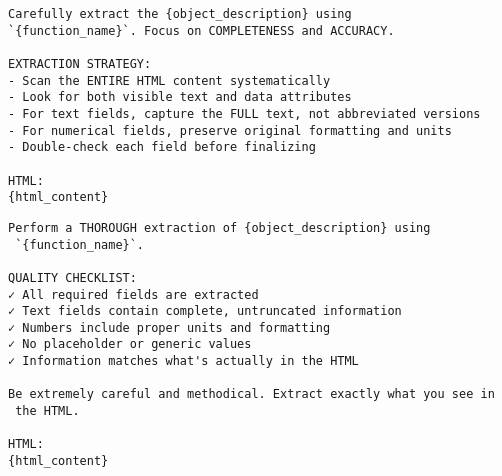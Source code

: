 \begin{latin}
\begin{tcolorbox}[colback=black!5!white,colframe=black!75!black,title=Expert Agent: Round 2 (Accuracy and Completeness)]
\begin{verbatim}
Carefully extract the {object_description} using 
`{function_name}`. Focus on COMPLETENESS and ACCURACY.

EXTRACTION STRATEGY:
- Scan the ENTIRE HTML content systematically
- Look for both visible text and data attributes
- For text fields, capture the FULL text, not abbreviated versions
- For numerical fields, preserve original formatting and units
- Double-check each field before finalizing

HTML:
{html_content}
\end{verbatim}
\end{tcolorbox}
\end{latin}

\begin{latin}
\begin{tcolorbox}[colback=black!5!white,colframe=black!75!black,title=Expert Agent: Round 3 (Quality Checklist)]
\begin{verbatim}
Perform a THOROUGH extraction of {object_description} using
 `{function_name}`.

QUALITY CHECKLIST:
✓ All required fields are extracted
✓ Text fields contain complete, untruncated information
✓ Numbers include proper units and formatting
✓ No placeholder or generic values
✓ Information matches what's actually in the HTML

Be extremely careful and methodical. Extract exactly what you see in
 the HTML.

HTML:
{html_content}
\end{verbatim}
\end{tcolorbox}
\end{latin}
